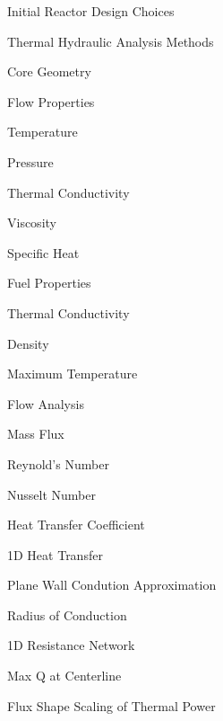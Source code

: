 \documentclass{report}
\begin{document}
\begin{outline}
      \begin{outline}
      \item { Initial Reactor Design Choices }
      \item { Thermal Hydraulic Analysis Methods }
          \begin{outline}
          \item { Core Geometry }
          \item { Flow Properties }
              \begin{outline}
              \item { Temperature }
              \item { Pressure }
              \item { Thermal Conductivity }
              \item { Viscosity }
              \item { Specific Heat }
              \end{outline}
          \item { Fuel Properties }
              \begin{outline}
              \item { Thermal Conductivity }
              \item { Density }
              \item { Maximum Temperature }
              \end{outline}
          \item { Flow Analysis}
              \begin{outline}
              \item { Mass Flux }
              \item { Reynold's Number }
              \item { Nusselt Number }
              \item { Heat Transfer Coefficient }
              \end{outline}
          \item { 1D Heat Transfer }
              \begin{outline}
              \item { Plane Wall Condution Approximation }
              \item { Radius of Conduction }
              \item { 1D Resistance Network }
              \item { Max Q at Centerline }
              \item { Flux Shape Scaling of Thermal Power}
              \end{outline}

\end{outline}
\end{outline}
\end{outline}
\end{document}
